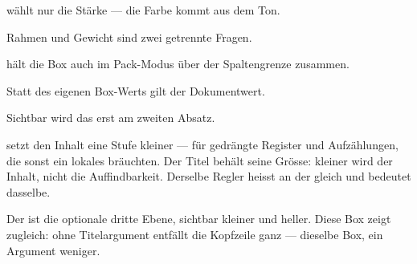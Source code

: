\begin{defbox}[Kräftige Kontur\ZSFTitleTag{frame=hard}][frame=hard]
   wählt nur die Stärke — die Farbe kommt aus dem Ton.
\end{defbox}

\begin{defbox}[Rahmenlos mit Kopfzeile\ZSFTitleTag{frame=none}][frame=none]
  Rahmen und Gewicht sind zwei getrennte Fragen.
\end{defbox}

\begin{defbox}
   hält die Box auch im Pack-Modus über der Spaltengrenze
  zusammen.
\end{defbox}

\begin{defbox}[Absatzabstand vom Dokument\ZSFTitleTag{bodyparskip=inherit}][bodyparskip=inherit]
  Statt des eigenen Box-Werts gilt der Dokumentwert.

  Sichtbar wird das erst am zweiten Absatz.
\end{defbox}

\begin{defbox}[Eine Stufe kleiner\ZSFTitleTag{font=dense}][font=dense]
   setzt den Inhalt eine Stufe kleiner — für gedrängte
  Register und Aufzählungen, die sonst ein lokales 
  bräuchten. Der Titel behält seine Grösse: kleiner wird der Inhalt, nicht die
  Auffindbarkeit. Derselbe Regler heisst an der  gleich
  und bedeutet dasselbe.
\end{defbox}


\begin{defbox}[][weight=quiet]
  Der  ist die optionale dritte Ebene, sichtbar
  kleiner und heller. Diese Box zeigt zugleich: ohne Titelargument entfällt
  die Kopfzeile ganz — dieselbe Box, ein Argument weniger.
\end{defbox}
